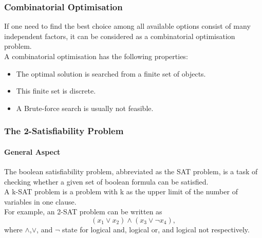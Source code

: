 \documentclass{beamer}
\begin{document}
\begin{frame}
	\frametitle{Combinatorial Optimisation}
	If one need to find the best choice among all available options consist of many independent factors, it can be considered
	as a combinatorial optimisation problem.\\
	A combinatorial optimisation has the following properties:\\
	\begin{itemize}
		\item The optimal solution is searched from a finite set of objects.
		\item This finite set is discrete.
		\item A Brute-force search is usually not feasible.
	\end{itemize}
		
\end{frame}

\begin{frame}
	\frametitle{The 2-Satisfiability Problem}
	\framesubtitle{General Aspect}
	The boolean satisfiability problem, abbreviated as the SAT problem, is a task of checking whether a given
	set of boolean formula can be satisfied.\\
	A k-SAT problem is a problem with k as the upper limit of the
	number of variables in one clause. \\
	For example, an 2-SAT problem can be written as 
	\begin{equation*}
	(x_1\lor x_2)\land (x_3\lor \neg x_4),
	\end{equation*}
	where $\land$,$\lor$, and $\neg$ state for logical and, logical or, and logical not respectively. 
	
\end{frame}
\end{document}
